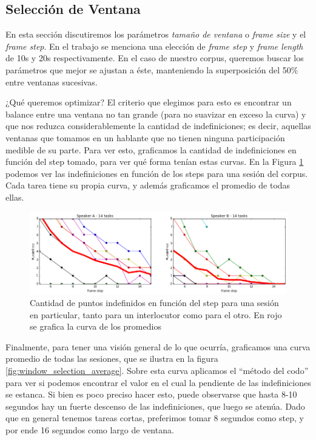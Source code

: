 \subsection{Selección de Ventana}
\label{sec:window_selection}

En esta sección discutiremos los parámetros \emph{tamaño de ventana} o \emph{frame size} y el \emph{frame step}. En el trabajo \cite{KOU2008.2} se menciona una elección de \emph{frame step} y \emph{frame length} de 10s y 20s respectivamente. En el caso de nuestro corpus, queremos buscar los parámetros que mejor se ajustan a éste, manteniendo la superposición del 50\% entre ventanas sucesivas.

¿Qué queremos optimizar? El criterio que elegimos para esto es encontrar un balance entre una ventana no tan grande (para no suavizar en exceso la curva) y que nos reduzca considerablemente la cantidad de indefiniciones; es decir, aquellas ventanas que tomamos en un hablante que no tienen ninguna participación medible de su parte. Para ver esto, graficamos la cantidad de indefiniciones en función del step tomado, para ver qué forma tenían estas curvas. En la Figura \ref{fig:window_selection_session} podemos ver las indefiniciones en función de los steps para una sesión del corpus. Cada tarea tiene su propia curva, y además graficamos el promedio de todas ellas.

\begin{figure}
\centering
\includegraphics[width=15cm]{images/window_selection_for_session.png}
\caption{Cantidad de puntos indefinidos en función del step para una sesión en particular, tanto para un interlocutor como para el otro. En rojo se grafica la curva de los promedios}
\label{fig:window_selection_session}
\end{figure}

Finalmente, para tener una visión general de lo que ocurría, graficamos una curva promedio de todas las sesiones, que se ilustra en la figura \ref{fig:window_selection_average}. Sobre esta curva aplicamos el ``método del codo'' para ver si podemos encontrar el valor en el cual la pendiente de las indefiniciones se estanca. Si bien es poco preciso hacer esto, puede observarse que hasta 8-10 segundos hay un fuerte descenso de las indefiniciones, que luego se atenúa. Dado que en general tenemos tareas cortas, preferimos tomar 8 segundos como step, y por ende 16 segundos como largo de ventana.

